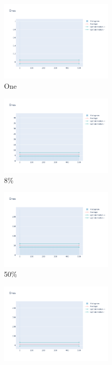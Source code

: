 \documentclass[12pt, fleqn]{report}                             %
\theoremstyle{break}                                            %
\begin{document}
      \begin{figure}[ht!]
        \centering
        \begin{subfigure}[b]{0.4\linewidth}
          \includegraphics[width=0.6\textwidth]{Images/72/dia-a.png}
          \caption{One}
        \end{subfigure}
        \begin{subfigure}[b]{0.4\linewidth}
          \includegraphics[width=0.6\textwidth]{Images/72/dia-b.png}
          \caption{8\%}
        \end{subfigure}
        \begin{subfigure}[b]{0.4\linewidth}
          \includegraphics[width=0.6\textwidth]{Images/72/dia-c.png}
          \caption{50\%}
        \end{subfigure}
        \begin{subfigure}[b]{0.4\linewidth}
          \includegraphics[width=0.6\textwidth]{Images/72/dia-d.png}

\end{subfigure}
\end{figure}
\end{document}
